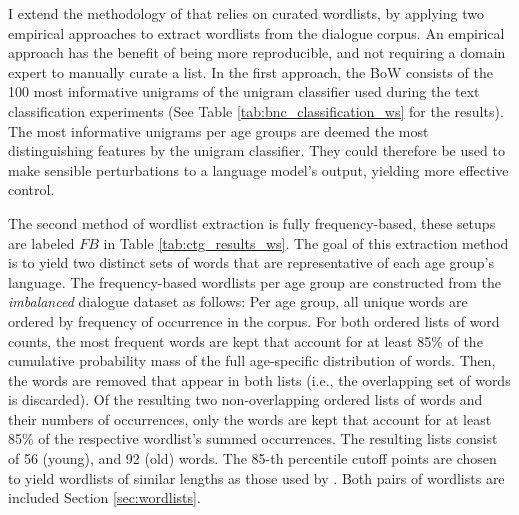 I extend the methodology of \cite{dathathri2019plug} that relies on curated wordlists, by applying two empirical approaches to extract wordlists from the dialogue corpus. An empirical approach has the benefit of being more reproducible, and not requiring a domain expert to manually curate a list. In the first approach, the BoW consists of the 100 most informative unigrams of the unigram classifier used during the text classification experiments (See Table \ref{tab:bnc_classification_ws} for the results). The most informative unigrams per age groups are deemed the most distinguishing features by the unigram classifier. They could therefore be used to make sensible perturbations to a language model's output, yielding more effective control.

The second method of wordlist extraction is fully frequency-based, these setups are labeled $FB$ in Table \ref{tab:ctg_results_ws}. The goal of this extraction method is to yield two distinct sets of words that are representative of each age group's language. The frequency-based wordlists per age group are constructed from the \textit{imbalanced} dialogue dataset as follows: Per age group, all unique words are ordered by frequency of occurrence in the corpus. For both ordered lists of word counts, the most frequent words are kept that account for at least 85\% of the cumulative probability mass of the full age-specific distribution of words. Then, the words are removed that appear in both lists (i.e., the overlapping set of words is discarded). Of the resulting two non-overlapping ordered lists of words and their numbers of occurrences, only the words are kept that account for at least 85\% of the respective wordlist's summed occurrences. The resulting lists consist of 56 (young), and 92 (old) words. The 85-th percentile cutoff points are chosen to yield wordlists of similar lengths as those used by \cite{dathathri2019plug}. Both pairs of wordlists are included Section \ref{sec:wordlists}.



